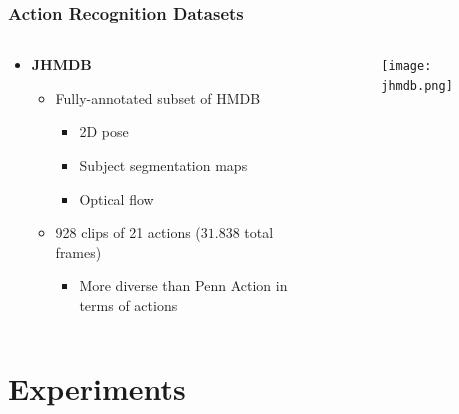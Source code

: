 \documentclass[9pt]{beamer}
\providecommand{\source}{\\ \footnotesize \tugreen{Source:} \footnotemark}
\newenvironment{myframe}[1][]{%
\begin{frame}%
\frametitle{#1}
\setcounter{footnote}{0}


}{%
\end{frame}%
}
\begin{document}
\begin{myframe}[Action Recognition Datasets]
  \begin{columns}[T]
      \begin{column}{.48\textwidth}
          \begin{itemize}
              \item \textbf{JHMDB\footnotemark}
              \begin{itemize}
                  \item Fully-annotated subset of HMDB
                  \begin{itemize}
                      \item 2D pose
                      \item Subject segmentation maps
                      \item Optical flow
                  \end{itemize}
                  \item 928 clips of 21 actions ($31.838$ total frames)
                  \begin{itemize}
                      \item More diverse than Penn Action in terms of actions
                  \end{itemize}
              \end{itemize}
          \end{itemize}
      \end{column}
      \begin{column}{.48\textwidth}
          \begin{figure}
              \texttt{[image: jhmdb.png]}
              \centering
              \source
          \end{figure}
      \end{column}
  \end{columns}
\end{myframe}

\section{Experiments}
\end{document}
